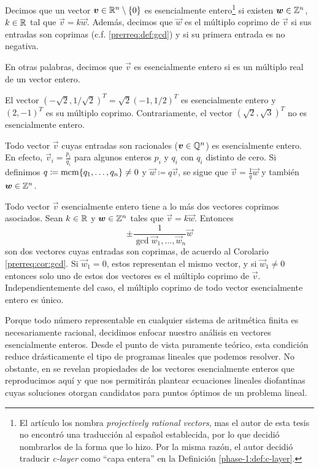 \begin{definition}
	Decimos que un vector $\boldsymbol{v} \in \mathbb{R}^n \setminus \lbrace 0 \rbrace$ es esencialmente
	entero\footnote{El artículo los nombra \textit{projectively rational vectors}, mas el autor de
	esta tesis no encontró una traducción al español establecida, por lo que decidió nombrarlos de
	la forma que lo hizo. Por la misma razón, el autor decidió traducir \textit{c-layer} como ``capa
	entera'' en la Definición \ref{phase-1:def:c-layer}.} si existen $\boldsymbol{w} \in \mathbb{Z}^n$, $k \in \mathbb{R}$ tal
	que $\vec{v} = k\vec{w}$. Además, decimos que $\vec{w}$ es el múltiplo coprimo de $\vec{v}$ si sus
	entradas son coprimas (c.f. \ref{prerreq:def:gcd}) y si su primera entrada es no negativa.
\end{definition}
En otras palabras, decimos que $\vec{v}$ es esencialmente entero si es un múltiplo real de un vector
entero.
\begin{example}
	El vector $\left(-\sqrt{2}, 1/\sqrt{2}\right)^T = \sqrt{2}(-1, 1/2)^T$ es esencialmente entero
	y $(2, -1)^T$ es su múltiplo coprimo. Contrariamente, el vector $(\sqrt{2}, \sqrt{3})^T$ no es
	esencialmente entero.
\end{example}
\begin{observation}
	Todo vector $\vec{v}$ cuyas entradas son racionales ($\boldsymbol{v} \in \mathbb{Q}^n$) es esencialmente
	entero. En efecto, $\vec{v}_i = \frac{p_i}{q_i}$ para algunos enteros $p_i$ y $q_i$ con $q_i$
	distinto de cero. Si definimos $q \coloneq \mathop{\mathrm{mcm}{\left\lbrace q_1, \ldots, q_n \right\rbrace}} \neq 0$ y $\vec{w} \coloneq
	q\vec{v}$, se sigue que $\vec{v} = \frac{1}{q}\vec{w}$ y también $\boldsymbol{w} \in \mathbb{Z}^n$.
\end{observation}
\begin{observation}
	Todo vector $\vec{v}$ esencialmente entero tiene a lo más dos vectores coprimos asociados. Sean
	$k \in \mathbb{R}$ y $\boldsymbol{w} \in \mathbb{Z}^n$ tales que $\vec{v} = k\vec{w}$. Entonces
	\begin{equation*}
		\pm \frac{1}{\gcd{\vec{w}_1, \ldots, \vec{w}_n}}\vec{w}
	\end{equation*}
	son dos vectores cuyas entradas son coprimas, de acuerdo al Corolario \ref{prerreq:cor:gcd}. Si
	$\vec{w}_1 = 0$, estos representan el mismo vector, y si $\vec{w}_1 \neq 0$ entonces solo uno de
	estos dos vectores es el múltiplo coprimo de $\vec{v}$. Independientemente del caso, el múltiplo
	coprimo de todo vector esencialmente entero es único.
\end{observation}

Porque todo número representable en cualquier sistema de aritmética finita es necesariamente
racional, decidimos enfocar nuestro análisis en vectores esencialmente enteros. Desde el punto de
vista puramente teórico, esta condición reduce drásticamente el tipo de programas lineales que
podemos resolver. No obstante, en \cite{herr} se revelan propiedades de los vectores esencialmente
enteros que reproducimos aquí y que nos permitirán plantear ecuaciones lineales diofantinas cuyas
soluciones otorgan candidatos para puntos óptimos de un problema lineal.

